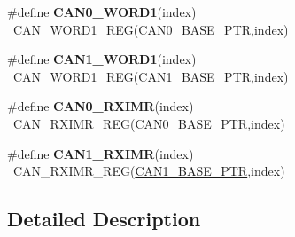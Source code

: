 \begin{DoxyCompactItemize}
\item 
\hypertarget{group___c_a_n___register___accessor___macros_ga4af1bfb5724c2c008255212b870e19f1}{}\#define {\bfseries C\+A\+N0\+\_\+\+W\+O\+R\+D1}(index)                                            ~C\+A\+N\+\_\+\+W\+O\+R\+D1\+\_\+\+R\+E\+G(\hyperlink{group___c_a_n___peripheral_ga1ee8f499e10af9b8e3132e0168e519b9}{C\+A\+N0\+\_\+\+B\+A\+S\+E\+\_\+\+P\+T\+R},index)\label{group___c_a_n___register___accessor___macros_ga4af1bfb5724c2c008255212b870e19f1}

\item 
\hypertarget{group___c_a_n___register___accessor___macros_ga2921c15be0ff05b3a4df90d985c97556}{}\#define {\bfseries C\+A\+N1\+\_\+\+W\+O\+R\+D1}(index)                                            ~C\+A\+N\+\_\+\+W\+O\+R\+D1\+\_\+\+R\+E\+G(\hyperlink{group___c_a_n___peripheral_ga810387eeeb9ccd0e09ae057ff6f0d2ca}{C\+A\+N1\+\_\+\+B\+A\+S\+E\+\_\+\+P\+T\+R},index)\label{group___c_a_n___register___accessor___macros_ga2921c15be0ff05b3a4df90d985c97556}

\item 
\hypertarget{group___c_a_n___register___accessor___macros_ga90e907f58584ed65f8c8cd1ab79e4fc4}{}\#define {\bfseries C\+A\+N0\+\_\+\+R\+X\+I\+M\+R}(index)                                            ~C\+A\+N\+\_\+\+R\+X\+I\+M\+R\+\_\+\+R\+E\+G(\hyperlink{group___c_a_n___peripheral_ga1ee8f499e10af9b8e3132e0168e519b9}{C\+A\+N0\+\_\+\+B\+A\+S\+E\+\_\+\+P\+T\+R},index)\label{group___c_a_n___register___accessor___macros_ga90e907f58584ed65f8c8cd1ab79e4fc4}

\item 
\hypertarget{group___c_a_n___register___accessor___macros_ga3949267c8d6d6e34cd57e84f1168912c}{}\#define {\bfseries C\+A\+N1\+\_\+\+R\+X\+I\+M\+R}(index)                                            ~C\+A\+N\+\_\+\+R\+X\+I\+M\+R\+\_\+\+R\+E\+G(\hyperlink{group___c_a_n___peripheral_ga810387eeeb9ccd0e09ae057ff6f0d2ca}{C\+A\+N1\+\_\+\+B\+A\+S\+E\+\_\+\+P\+T\+R},index)\label{group___c_a_n___register___accessor___macros_ga3949267c8d6d6e34cd57e84f1168912c}

\end{DoxyCompactItemize}


\subsection{Detailed Description}
